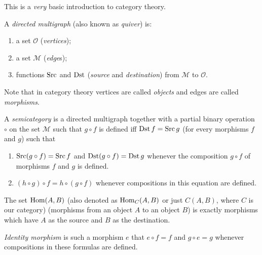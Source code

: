 This is a \emph{very} basic introduction to category theory.
\begin{defn}
A \emph{directed multigraph} (also known
as \emph{quiver}) is:
\begin{enumerate}
\item {}a set $\mathcal{O}$ (\emph{vertices});
\item {}a set $\mathcal{M}$ (\emph{edge}s);
\item {}functions $\operatorname{Src}$ and $\operatorname{Dst}$ (\emph{source}
and \emph{destination}) from $\mathcal{M}$ to $\mathcal{O}$.
\end{enumerate}
\end{defn}
Note that in category theory vertices
are called \emph{objects} and edges are called \emph{morphisms}.
\begin{defn}
A \emph{semicategory} is a directed multigraph
together with a partial binary operation $\circ$ on the set $\mathcal{M}$
such that $g\circ f$ is defined iff $\operatorname{Dst} f=\operatorname{Src} g$ (for every morphisms
$f$ and $g$) such that
\begin{enumerate}
\item $\operatorname{Src}(g\circ f)=\operatorname{Src} f$ and $\operatorname{Dst}(g\circ f)=\operatorname{Dst} g$ whenever the
composition $g\circ f$ of morphisms $f$ and $g$ is defined.
\item $(h\circ g)\circ f=h\circ(g\circ f)$ whenever compositions in this
equation are defined.
\end{enumerate}
\end{defn}

\begin{defn}
The set $\operatorname{Hom}(A,B)$ (also denoted as $\operatorname{Hom}_{C}(A,B)$ or just $C(A,B)$,
where $C$ is our category) (morphisms from an object $A$ to an object
$B$) is exactly morphisms which have $A$ as the source and $B$
as the destination.
\end{defn}

\begin{defn}
\emph{Identity morphism} is such a morphism
$e$ that $e\circ f=f$ and $g\circ e=g$ whenever compositions in
these formulas are defined.
\end{defn}

